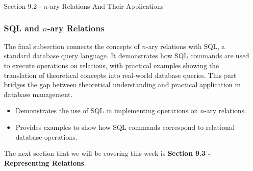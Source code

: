 \begin{notes}{Section 9.2 - $n$-ary Relations And Their Applications}
    \subsubsection*{SQL and $n$-ary Relations}
    The final subsection connects the concepts of $n$-ary relations with SQL, a standard database query language. It demonstrates how SQL commands are used to execute operations on relations, with 
    practical examples showing the translation of theoretical concepts into real-world database queries. This part bridges the gap between theoretical understanding and practical application in database management.
    \begin{itemize}
        \item Demonstrates the use of SQL in implementing operations on $n$-ary relations.
        \item Provides examples to show how SQL commands correspond to relational database operations.
    \end{itemize}
\end{notes}

The next section that we will be covering this week is \textbf{Section 9.3 - Representing Relations}.


